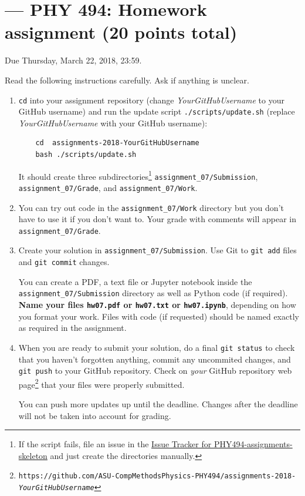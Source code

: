 \documentclass[letterpaper]{scrartcl}
\newcommand{\anumber}{7}
\newcommand{\anum}{0\anumber}
\begin{document}

\setcounter{section}{\anumber}
\addtocounter{section}{-1}
\section{ --- PHY 494: Homework assignment (20 points total)}

\noindent Due Thursday, March 22, 2018,
23:59.

\noindent
Read the following instructions carefully. Ask if anything is unclear.
\begin{enumerate}
\item \texttt{cd} into your assignment repository (change
  \emph{YourGitHubUsername} to your GitHub username) and run the
  update script \texttt{./scripts/update.sh} (replace
  \emph{YourGitHubUsername} with your GitHub username):
  \begin{verbatim}
    cd  assignments-2018-YourGitHubUsername
    bash ./scripts/update.sh
  \end{verbatim}
  It should create three subdirectories\footnote{If the script fails,
    file an issue in the
    \href{https://github.com/ASU-CompMethodsPhysics-PHY494/PHY494-assignments-skeleton/issues}{Issue
      Tracker for PHY494-assignments-skeleton} and just create the
    directories manually.} \texttt{assignment\_\anum/Submission},
  \texttt{assignment\_\anum/Grade}, and
  \texttt{assignment\_\anum/Work}.
\item You can try out code in the \texttt{assignment\_\anum/Work}
  directory but you don't have to use it if you don't want to. Your
  grade with comments will appear in
  \texttt{assignment\_\anum/Grade}.
\item Create your solution in
  \texttt{assignment\_\anum/Submission}. Use Git to \texttt{git
    add} files and \texttt{git commit} changes.

  You can create a PDF, a text file or Jupyter notebook inside the
  \texttt{assignment\_\anum/Submission} directory as well as Python
  code (if required). \textbf{Name your files \texttt{hw\anum.pdf} or
    \texttt{hw\anum.txt} or \texttt{hw\anum.ipynb}}, depending on how
  you format your work. Files with code (if requested) should be named
  exactly as required in the assignment.
\item When you are ready to submit your solution, do a final
  \texttt{git status} to check that you haven't forgotten anything,
  commit any uncommited changes, and \texttt{git push} to your GitHub
  repository. Check on \emph{your} GitHub repository web
  page\footnote{\texttt{https://github.com/ASU-CompMethodsPhysics-PHY494/assignments-2018-\emph{YourGitHubUsername}}}
  that your files were properly submitted.

  You can push more updates up until the deadline. Changes after the
  deadline will not be taken into account for grading.
\end{enumerate}
\end{document}
